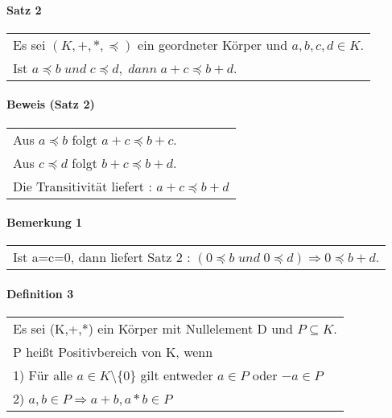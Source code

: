 \documentclass[a4paper]{scrartcl}
\begin{document}
\paragraph{Satz 2}
\begin{tabbing}
\begin{tabular}{l}
Es sei $ (K,+,*,\preceq) $ ein geordneter Körper und $ a,b,c,d \in K $.\\
Ist $ a \preceq b\; und\; c \preceq d,\; dann\; a+c \preceq b+d. $
\end{tabular}
\end{tabbing}

\paragraph{Beweis (Satz 2)}
\begin{tabbing}
\begin{tabular}{l}
Aus $ a\preceq b $ folgt $ a+c \preceq b+c $.\\
Aus $ c\preceq d $ folgt $ b+c \preceq b+d $.\\
Die Transitivität liefert : $ a+c \preceq b+d $
\end{tabular}
\end{tabbing}

\paragraph{Bemerkung 1}
\begin{tabbing}
\begin{tabular}{l}
Ist a=c=0, dann liefert Satz 2 : 
$ (0 \preceq b\; und\; 0 \preceq d) \Rightarrow 0 \preceq b+d. $
\end{tabular}
\end{tabbing}

\paragraph{Definition 3}
\begin{tabbing}
\begin{tabular}{l}
Es sei (K,+,*) ein Körper mit Nullelement D und $P\subseteq K$. \\
P heißt Positivbereich von K, wenn\\
1) Für alle $a\in K\setminus\{ 0\}$ gilt entweder $a\in P$ oder $-a\in P$\\
2) $a,b\in P \Rightarrow a+b, a*b\in P$
\end{tabular}
\end{tabbing}
\end{document}
